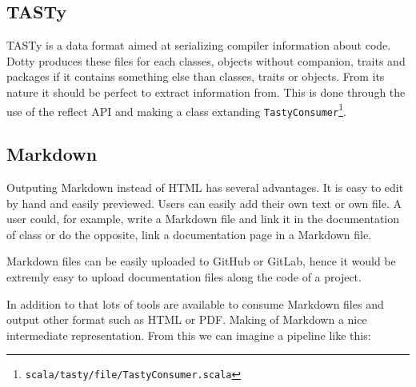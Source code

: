 \documentclass{report}
\begin{document}
\subsection{TASTy}
TASTy is a data format aimed at serializing compiler information about code. Dotty produces these files for each classes, objects without companion, traits and packages if it contains something else than classes, traits or objects. From its nature it should be perfect to extract information from.
This is done through the use of the reflect API and making a class extanding \texttt{TastyConsumer}\footnote{\texttt{scala/tasty/file/TastyConsumer.scala}}.

\subsection{Markdown}
Outputing Markdown instead of HTML has several advantages. It is easy to edit by hand and easily previewed. Users can easily add their own text or own file. A user could, for example, write a Markdown file and link it in the documentation of class or do the opposite, link a documentation page in a Markdown file.

Markdown files can be easily uploaded to GitHub or GitLab, hence it would be extremly easy to upload documentation files along the code of a project.

In addition to that lots of tools are available to consume Markdown files and output other format such as HTML or PDF. Making of Markdown a nice intermediate representation. From this we can imagine a pipeline like this:
\begin{center}
\end{center}
\end{document}
